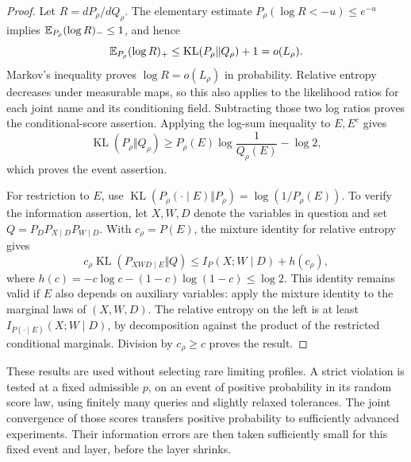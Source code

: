 \begin{proof}
Let $R=dP_\rho/dQ_\rho$.  The elementary estimate
$P_\rho(\log R<-u)\le e^{-u}$ implies
$\mathbb E_{P_\rho}(\log R)_-\le1$, and hence
\[
 \mathbb E_{P_\rho}(\log R)_+
   \le\operatorname{KL}(P_\rho\Vert Q_\rho)+1=o(L_\rho).
\]
Markov's inequality proves $\log R=o(L_\rho)$ in probability.
Relative entropy decreases under measurable maps, so this also applies
to the likelihood ratios for each joint name and its conditioning
field.  Subtracting those two log ratios proves the conditional-score
assertion.  Applying the log-sum inequality to $E,E^c$ gives
\[
 \operatorname{KL}(P_\rho\Vert Q_\rho)
 \ge P_\rho(E)\log\frac1{Q_\rho(E)}-\log2,
\]
which proves the event assertion.

For restriction to $E$, use
$\operatorname{KL}(P_\rho(\cdot\mid E)\Vert P_\rho)=\log(1/P_\rho(E))$.
To verify the information assertion, let $X,W,D$ denote the variables
in question and set $Q=P_D P_{X\mid D}P_{W\mid D}$.  With $c_\rho=P(E)$,
the mixture identity for relative entropy gives
\[
 c_\rho\operatorname{KL}(P_{XWD\mid E}\Vert Q)
 \le I_P(X;W\mid D)+h(c_\rho),
\]
where $h(c)=-c\log c-(1-c)\log(1-c)\le\log2$.
This identity remains valid if $E$ also depends on auxiliary variables:
apply the mixture identity to the marginal laws of $(X,W,D)$.
The relative entropy on the left is at least
$I_{P(\cdot\mid E)}(X;W\mid D)$, by decomposition against the product
of the restricted conditional marginals.  Division by $c_\rho\ge c$
proves the result.
\end{proof}

These results are used without selecting rare limiting profiles.  A
strict violation is tested at a fixed admissible $p$, on an event of
positive probability in its random score law, using finitely many
queries and slightly relaxed tolerances.  The joint convergence of
those scores transfers positive probability to sufficiently advanced
experiments.  Their information errors are then taken sufficiently
small for this fixed event and layer, before the layer shrinks.

